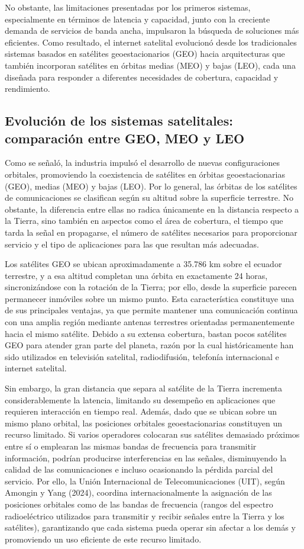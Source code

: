 No obstante, las limitaciones presentadas por los primeros sistemas, especialmente en términos de latencia y capacidad, junto con la creciente demanda de servicios de banda ancha, impulsaron la búsqueda de soluciones más eficientes. Como resultado, el internet satelital evolucionó desde los tradicionales sistemas basados en satélites geoestacionarios (GEO) hacia arquitecturas que también incorporan satélites en órbitas medias (MEO) y bajas (LEO), cada una diseñada para responder a diferentes necesidades de cobertura, capacidad y rendimiento.
\subsection{Evolución de los sistemas satelitales: comparación entre GEO, MEO y LEO}
Como se señaló, la industria impulsó el desarrollo de nuevas configuraciones orbitales, promoviendo la coexistencia de satélites en órbitas geoestacionarias (GEO), medias (MEO) y bajas (LEO). Por lo general, las órbitas de los satélites de comunicaciones se clasifican según su altitud sobre la superficie terrestre. No obstante, la diferencia entre ellas no radica únicamente en la distancia respecto a la Tierra, sino también en aspectos como el área de cobertura, el tiempo que tarda la señal en propagarse, el número de satélites necesarios para proporcionar servicio y el tipo de aplicaciones para las que resultan más adecuadas. 

Los satélites GEO se ubican aproximadamente a 35.786 km sobre el ecuador terrestre, y a esa altitud completan una órbita en exactamente 24 horas, sincronizándose con la rotación de la Tierra; por ello, desde la superficie parecen permanecer inmóviles sobre un mismo punto. Esta característica constituye una de sus principales ventajas, ya que permite mantener una comunicación continua con una amplia región mediante antenas terrestres orientadas permanentemente hacia el mismo satélite. Debido a su extensa cobertura, bastan pocos satélites GEO para atender gran parte del planeta, razón por la cual históricamente han sido utilizados en televisión satelital, radiodifusión, telefonía internacional e internet satelital.

Sin embargo, la gran distancia que separa al satélite de la Tierra incrementa considerablemente la latencia, limitando su desempeño en aplicaciones que requieren interacción en tiempo real. Además, dado que se ubican sobre un mismo plano orbital, las posiciones orbitales geoestacionarias constituyen un recurso limitado. Si varios operadores colocaran sus satélites demasiado próximos entre sí o emplearan las mismas bandas de frecuencia para transmitir información, podrían producirse interferencias en las señales, disminuyendo la calidad de las comunicaciones e incluso ocasionando la pérdida parcial del servicio. Por ello, la Unión Internacional de Telecomunicaciones (UIT), según Amongin y Yang (2024), coordina internacionalmente la asignación de las posiciones orbitales como de las bandas de frecuencia (rangos del espectro radioeléctrico utilizados para transmitir y recibir señales entre la Tierra y los satélites), garantizando que cada sistema pueda operar sin afectar a los demás y promoviendo un uso eficiente de este recurso limitado. 

